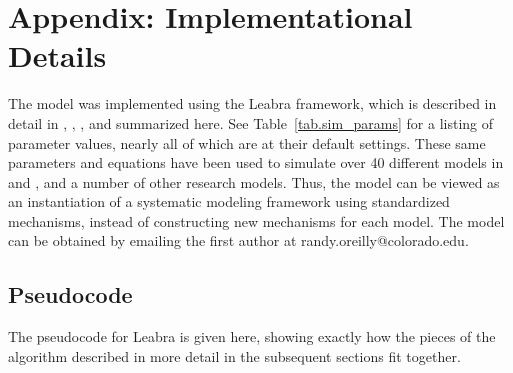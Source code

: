 \section{Appendix: Implementational Details}

The model was implemented using the Leabra framework, which is described in detail in , , , and summarized here.  See Table~\ref{tab.sim_params} for a listing of parameter values, nearly all of which are at their default settings.  These same parameters and equations have been used to simulate over 40 different models in  and , and a number of other research models.  Thus, the model can be viewed as an instantiation of a systematic modeling framework using standardized mechanisms, instead of constructing new mechanisms for each model.  The model can be obtained by emailing the first author at randy.oreilly@colorado.edu.

\subsection{Pseudocode}

The pseudocode for Leabra is given here, showing exactly how the
pieces of the algorithm described in more detail in the subsequent
sections fit together.

